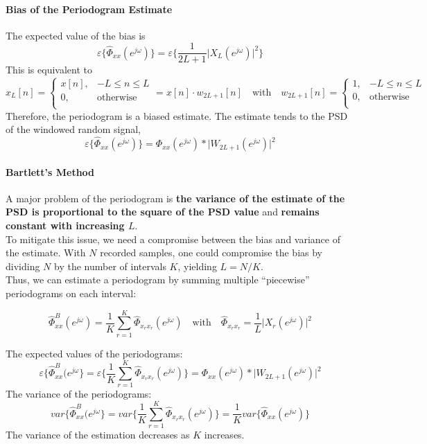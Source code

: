 \paragraph{Bias of the Periodogram Estimate}
The expected value of the bias is
\[
    \varepsilon\{\widehat{\Phi}_{xx}(e^{j\omega})\} = \varepsilon \bigg\{ \frac{1}{2L+1} \lvert X_{L}(e^{j\omega})\rvert^2 \bigg\}
\]
This is equivalent to
\[
    x_{L}[n] = 
    \begin{cases}
        x[n], & -L \leq n \leq L \\
        0, & \text{otherwise} \\
    \end{cases}
    = x[n] \cdot w_{2L+1}[n]
    \quad \text{with} \quad 
    w_{2L+1}[n] = 
    \begin{cases}
        1, & -L\leq n\leq L \\
        0, & \text{otherwise} \\
    \end{cases}
\]
Therefore, the periodogram is a biased estimate. The estimate tends to the PSD of the windowed random signal,
\[
    \varepsilon \{ \widehat{\Phi}_{xx}(e^{j\omega}) \} = \Phi_{xx}(e^{j\omega}) * \lvert W_{2L+1}(e^{j\omega}) \rvert^2
\]

\paragraph{Bartlett's Method}
A major problem of the periodogram is \textbf{the variance of the estimate of the PSD is proportional to the square of the PSD value} and \textbf{remains constant with increasing $L$}. \\

To mitigate this issue, we need a compromise between the bias and variance of the estimate. With $N$ recorded samples, one could compromise the bias by dividing $N$ by the number of intervals $K$, yielding $L = N/K$. \\

Thus, we can estimate a periodogram by summing multiple ``piecewise'' periodograms on each interval:

\[
    \widehat{\Phi}_{xx}^B (e^{j\omega}) = \frac{1}{K} \sum_{r=1}^{K} \hat{\Phi}_{x_{r}x_{r}} (e^{j\omega}) \quad \text{with} \quad \hat{\Phi}_{x_{r}x_{r}} = \frac{1}{L} \lvert X_{r} (e^{j\omega}) \rvert^2
\]

The expected values of the periodograms:
\[
    \varepsilon\{\widehat{\Phi}_{xx}^{B} (e^{j\omega}\}
    = \varepsilon\bigg\{ \frac{1}{K} \sum_{r=1}^{K} \widehat{\Phi}_{x_{r}x_{r}} (e^{j\omega}) \bigg\} = \Phi_{xx}(e^{j\omega}) * \lvert W_{2L+1}(e^{j\omega}) \rvert^2
\]
The variance of the periodograms:
\[
    var\{\widehat{\Phi}_{xx}^{B} (e^{j\omega}\} = var \bigg\{ \frac{1}{K} \sum_{r=1}^{K} \widehat{\Phi}_{x_{r}x_{r}} (e^{j\omega}) \bigg\} = \frac{1}{K} var\{\widehat{\Phi}_{xx}(e^{j\omega}) \}
\]
The variance of the estimation decreases as $K$ increases. 

